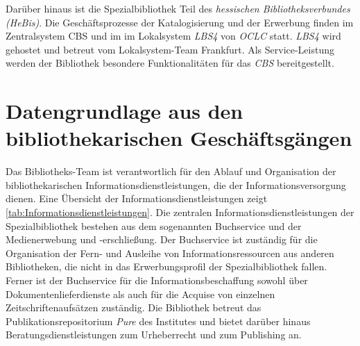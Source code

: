 Darüber hinaus ist die Spezialbibliothek Teil des \textit{hessischen Bibliotheksverbundes (HeBis)}. Die Geschäftsprozesse
der Katalogisierung und der Erwerbung finden im Zentralsystem \acrlong{CBS} und im im Lokalsystem \textit{LBS4} von
\textit{OCLC} statt. \textit{LBS4} wird gehostet und betreut vom Lokalsystem-Team Frankfurt. Als Service-Leistung werden der Bibliothek besondere Funktionalitäten
für das \textit{CBS} bereitgestellt.



\section{Datengrundlage aus den bibliothekarischen Geschäftsgängen}
Das Bibliotheks-Team ist verantwortlich für den Ablauf und Organisation der bibliothekarischen Informationsdienstleistungen, die der Informationsversorgung dienen.
Eine Übersicht der Informationsdienstleistungen zeigt \autoref{tab:Informationsdienstleistungen}.
Die zentralen Informationsdienstleistungen der Spezialbibliothek bestehen aus dem sogenannten Buchservice und der Medienerwebung und -erschließung. Der Buchservice ist zuständig für die Organisation der Fern- und Ausleihe von Informationsressourcen aus anderen Bibliotheken, die nicht in das Erwerbungsprofil der Spezialbibliothek fallen. Ferner ist der Buchservice für die Informationsbeschaffung sowohl über Dokumentenlieferdienste als auch für die Acquise von einzelnen Zeitschriftenaufsätzen zuständig. 
Die Bibliothek betreut das Publikationsrepositorium \textit{Pure} des Institutes und bietet darüber hinaus Beratungsdienstleistungen zum Urheberrecht und zum Publishing an. 

